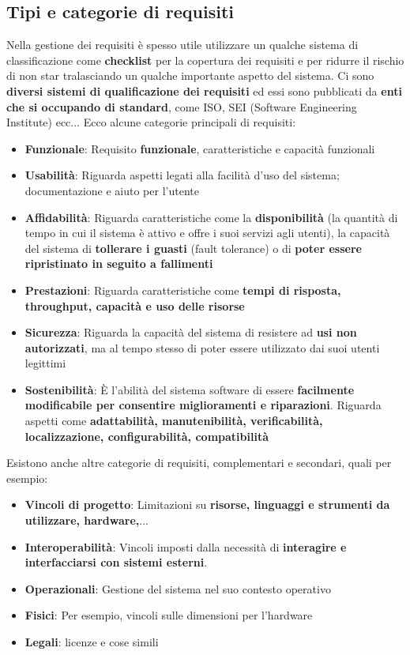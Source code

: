 \documentclass[12pt]{article}
\begin{document}
\subsection{Tipi e categorie di requisiti}
Nella gestione dei requisiti è spesso utile utilizzare un qualche sistema di classificazione come \textbf{checklist} per la copertura dei requisiti e per ridurre il rischio di non star tralasciando un qualche importante aspetto del sistema.
Ci sono \textbf{diversi sistemi di qualificazione dei requisiti} ed essi sono pubblicati da \textbf{enti che si occupando di standard}, come ISO, SEI (Software Engineering Institute) ecc... \newline
Ecco alcune categorie principali di requisiti:
\begin{itemize}
    \item \textbf{Funzionale}: Requisito \textbf{funzionale}, caratteristiche e capacità funzionali
    \item \textbf{Usabilità}: Riguarda aspetti legati alla facilità d'uso del sistema; documentazione e aiuto per l'utente
    \item \textbf{Affidabilità}: Riguarda caratteristiche come la \textbf{disponibilità} (la quantità di tempo in cui il sistema è attivo e offre i suoi servizi agli utenti), la capacità del sistema di \textbf{tollerare i guasti} (fault tolerance) o di \textbf{poter essere ripristinato in seguito a fallimenti}
    \item \textbf{Prestazioni}: Riguarda caratteristiche come \textbf{tempi di risposta, throughput, capacità e uso delle risorse}
    \item \textbf{Sicurezza}: Riguarda la capacità del sistema di resistere ad \textbf{usi non autorizzati}, ma al tempo stesso di poter essere utilizzato dai suoi utenti legittimi
    \item \textbf{Sostenibilità}: È l'abilità del sistema software di essere \textbf{facilmente modificabile per consentire miglioramenti e riparazioni}. Riguarda aspetti come \textbf{adattabilità, manutenibilità, verificabilità, localizzazione, configurabilità, compatibilità}
\end{itemize}
Esistono anche altre categorie di requisiti, complementari e secondari, quali per esempio:
\begin{itemize}
    \item \textbf{Vincoli di progetto}: Limitazioni su \textbf{risorse, linguaggi e strumenti da utilizzare, hardware,}... 
    \item \textbf{Interoperabilità}: Vincoli imposti dalla necessità di \textbf{interagire e interfacciarsi con sistemi esterni}.
    \item \textbf{Operazionali}: Gestione del sistema nel suo contesto operativo
    \item \textbf{Fisici}: Per esempio, vincoli sulle dimensioni per l'hardware
    \item \textbf{Legali}: licenze e cose simili
\end{itemize}
\end{document}
